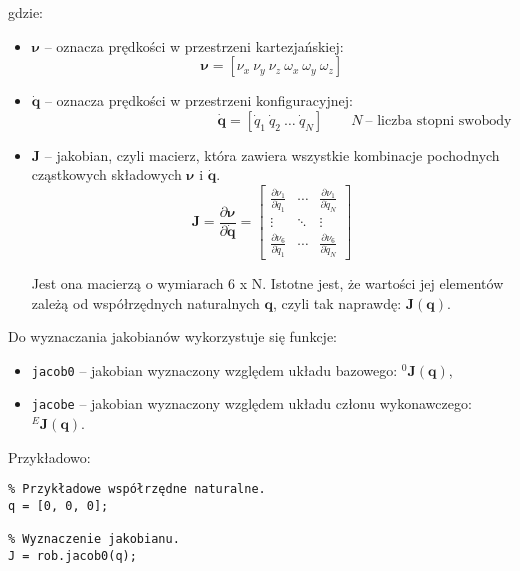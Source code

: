 \documentclass[11pt, a4paper]{article}
\newcommand{\vectorQ}{$\mathbf{q}$}
\begin{document}
gdzie:
\begin{itemize}
\item $\boldsymbol{\nu}$ -- oznacza prędkości w przestrzeni kartezjańskiej:
\begin{equation*}
\boldsymbol{\nu} = \left[
\nu_x \ \nu_y \ \nu_z \ \omega_x \ \omega_y \ \omega_z
\right]
\end{equation*}

\item $\mathbf{\dot{q}}$ -- oznacza prędkości w przestrzeni konfiguracyjnej:
\begin{equation*}
\phantom{\qquad N \text{-- liczba stopni swobody}}
\dot{\mathbf{q}} = \left[
\dot{q}_1 \ \dot{q}_2 \ \ldots \ \dot{q}_N
\right]
\qquad N \ \text{-- liczba stopni swobody}
\end{equation*}

\item $\mathbf{J}$ -- jakobian, czyli macierz, która zawiera wszystkie kombinacje pochodnych cząstkowych składowych
$\boldsymbol{\nu}$ i $\mathbf{\dot{q}}$.
\begin{equation*}
\mathbf{J} =
\frac{\partial \boldsymbol{\nu}}{\partial \dot{\mathbf{q}}} =
	\begin{bmatrix}
	\frac{\partial \nu_1}{\partial \dot{q}_1} & \cdots & \frac{\partial \nu_1}{\partial \dot{q}_N} \\
	\vdots & \ddots & \vdots\\
	\frac{\partial \nu_6}{\partial \dot{q}_1} & \cdots & \frac{\partial \nu_6}{\partial \dot{q}_N}
	\end{bmatrix}
\end{equation*}

Jest ona macierzą o wymiarach 6 x N. Istotne jest, że wartości jej elementów zależą od współrzędnych naturalnych \vectorQ{}, czyli tak naprawdę: $\mathbf{J}(\mathbf{q})$.
\end{itemize}

Do wyznaczania jakobianów wykorzystuje się funkcje:
\begin{itemize}
\item \texttt{jacob0} -- jakobian wyznaczony względem układu bazowego:
${}^{0}\mathbf{J}(\mathbf{q})$,
\item \texttt{jacobe} -- jakobian wyznaczony względem układu członu wykonawczego:
${}^{E}\mathbf{J}(\mathbf{q})$.
\end{itemize}

Przykładowo:
\begin{lstlisting}
% Przykładowe współrzędne naturalne.
q = [0, 0, 0];

% Wyznaczenie jakobianu.
J = rob.jacob0(q);
\end{lstlisting}
\end{document}
